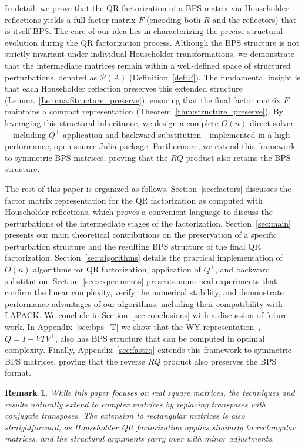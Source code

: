 \documentclass[a4paper,fleqn]{cas-sc}
\newtheorem{remark}{Remark}[section]
\begin{document}
In detail: we prove that the QR factorization of a BPS matrix via Householder reflections yields a full factor matrix $F$ (encoding both $R$ and the reflectors) that is itself BPS. The core of our idea lies in characterizing the precise structural evolution during the QR factorization process. Although the BPS structure is not strictly invariant under individual Householder transformations, we demonstrate that the intermediate matrices remain within a well-defined space of structured perturbations, denoted as $\mathcal{P}(A)$ (Definition~\ref{def:P}). The fundamental insight is that each Householder reflection preserves this extended structure (Lemma~\ref{Lemma:Structure_preserve}), ensuring that the final factor matrix $F$ maintains a compact representation (Theorem~\ref{thm:structure_preserve}). By leveraging this structural inheritance, we design a complete $O(n)$ direct solver—including $Q^\top$ application and backward substitution—implemented in a high-performance, open-source Julia package. Furthermore, we extend this framework to symmetric BPS matrices, proving that the $RQ$ product also retains the BPS structure.


The rest of this paper is organized as follows.
Section~\ref{sec:factors} discusses the factor matrix representation for the QR factorization as computed with Householder reflections, which proves a convenient language to discuss the perturbations of the intermediate stages of the factorization.
Section~\ref{sec:main} presents our main theoretical contributions on the preservation of a specific perturbation structure and the resulting BPS structure of the final QR factorization. Section~\ref{sec:algorithms} details the practical implementation of $O(n)$ algorithms for QR factorization, application of $Q^\top$, and backward substitution. Section~\ref{sec:experiments} presents numerical experiments that confirm the linear complexity, verify the numerical stability, and demonstrate performance advantages of our algorithms, including their compatibility with LAPACK. We conclude in Section~\ref{sec:conclusions} with a discussion of future work. In Appendix~\ref{sec:bps_T} we show that the  WY representation~\citep{schreiber1987storage}, $Q = I - V T V^\top$, also has BPS structure that can be computed in optimal complexity. Finally, Appendix~\ref{sec:fastrq} extends this framework to symmetric BPS matrices, proving that the reverse $RQ$ product also preserves the BPS format.

\begin{remark}
While this paper focuses on real square matrices, the techniques and results naturally extend to complex matrices by replacing transposes with conjugate transposes. The extension to rectangular matrices is also straightforward, as Householder QR factorization applies similarly to rectangular matrices, and the structural arguments carry over with minor adjustments. 
\end{remark}
\end{document}
